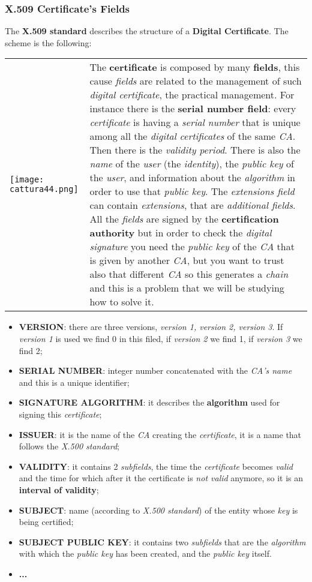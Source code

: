\documentclass{article}
\begin{document}
\subsubsection{X.509 Certificate's Fields}
The \textbf{X.509 standard} describes the structure of a \textbf{Digital Certificate}. The scheme is the following:\\
\begin{tabular}{C{6cm}  L{9cm}}
\texttt{[image: cattura44.png]} 
& The \textbf{certificate} is composed by many \textbf{fields}, this cause \emph{fields} are related to the management of such \emph{digital certificate}, the practical management. For instance there is the \textbf{serial number field}: every \emph{certificate} is having a \emph{serial number} that is unique among all the \emph{digital certificates} of the same \emph{CA}. Then there is the \emph{validity period}. There is also the \emph{name} of the \emph{user} (the \emph{identity}), the \emph{public key} of the \emph{user}, and information about the \emph{algorithm} in order to use that \emph{public key}. The \emph{extensions field} can contain \emph{extensions}, that are \emph{additional fields}. All the \emph{fields} are signed by the \textbf{certification authority} but in order to check the \emph{digital signature} you need the \emph{public key} of the \emph{CA} that is given by another \emph{CA}, but you want to trust also that different \emph{CA} so this generates a \emph{chain} and this is a problem that we will be studying how to solve it.
\end{tabular}
\begin{itemize}
\item \textbf{VERSION}: there are three versions, \emph{version 1, version 2, version 3}. If \emph{version 1} is used we find 0 in this filed, if \emph{version 2} we find 1, if \emph{version 3} we find 2;
\item \textbf{SERIAL NUMBER}: integer number concatenated with the \emph{CA’s name} and this is a unique identifier;
\item \textbf{SIGNATURE ALGORITHM}: it describes the \textbf{algorithm} used for signing this \emph{certificate};
\item \textbf{ISSUER}: it is the name of the \emph{CA} creating the \emph{certificate}, it is a name that follows the\emph{ X.500 standard};
\item \textbf{VALIDITY}: it contains 2 \emph{subfields}, the time the \emph{certificate} becomes \emph{valid} and the time for which after it the certificate is \emph{not valid} anymore, so it is an \textbf{interval of validity};
\item \textbf{SUBJECT}: name (according to \emph{X.500 standard}) of the entity whose \emph{key} is being certified;
\item \textbf{SUBJECT PUBLIC KEY}: it contains two \emph{subfields} that are the \emph{algorithm} with which the \emph{public key} has been created, and the\emph{ public key }itself.
\item \textbf{...}
\end{itemize}
\end{document}
